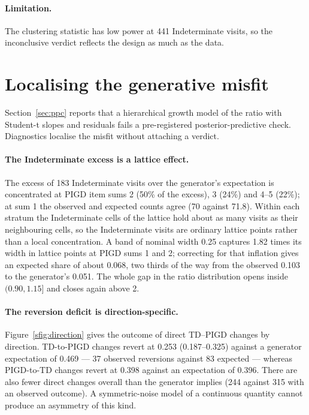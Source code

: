 \paragraph{Limitation.} The clustering statistic has low power at 441
Indeterminate visits, so the inconclusive verdict reflects the design as much as
the data.

\section{Localising the generative misfit}
\label{sup:ppc}

Section~\ref{sec:ppc} reports that a hierarchical growth model of the ratio with
Student-t slopes and residuals fails a pre-registered posterior-predictive check.
Diagnostics localise the misfit without attaching a verdict.

\paragraph{The Indeterminate excess is a lattice effect.} The excess of 183
Indeterminate visits over the generator's expectation is concentrated at PIGD
item sums 2 (50\% of the excess), 3 (24\%) and 4--5 (22\%); at sum 1 the observed
and expected counts agree (70 against 71.8). Within each stratum the
Indeterminate cells of the lattice hold about as many visits as their
neighbouring cells, so the Indeterminate visits are ordinary lattice points
rather than a local concentration. A band of nominal width 0.25 captures 1.82
times its width in lattice points at PIGD sums 1 and 2; correcting for that
inflation gives an expected share of about 0.068, two thirds of the way from the
observed 0.103 to the generator's 0.051. The whole gap in the ratio distribution
opens inside $(0.90, 1.15]$ and closes again above 2.

\paragraph{The reversion deficit is direction-specific.}
Figure~\ref{sfig:direction} gives the outcome of direct TD--PIGD changes by
direction. TD-to-PIGD changes revert at 0.253 (0.187--0.325) against a generator
expectation of 0.469 --- 37 observed reversions against 83 expected --- whereas
PIGD-to-TD changes revert at 0.398 against an expectation of 0.396. There are
also fewer direct changes overall than the generator implies (244 against 315
with an observed outcome). A symmetric-noise model of a continuous quantity
cannot produce an asymmetry of this kind.

